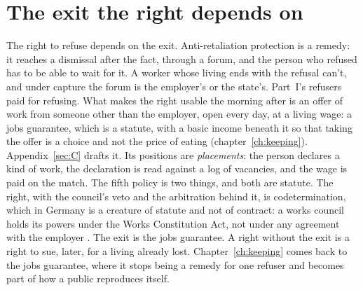 \section{The exit the right depends on}
\label{sec:10.2}
The right to refuse depends on the exit. Anti-retaliation protection is a remedy: it reaches a dismissal after the fact, through a forum, and the person who refused has to be able to wait for it. A worker whose living ends with the refusal can't, and under capture the forum is the employer's or the state's. Part~I's refusers paid for refusing. What makes the right usable the morning after is an offer of work from someone other than the employer, open every day, at a living wage: a jobs guarantee, which is a statute, with a basic income beneath it so that taking the offer is a choice and not the price of eating (chapter~\ref{ch:keeping}). Appendix~\ref{sec:C} drafts it. Its positions are \emph{placements}: the person declares a kind of work, the declaration is read against a log of vacancies, and the wage is paid on the match. The fifth policy is two things, and both are statute. The right, with the council's veto and the arbitration behind it, is codetermination, which in Germany is a creature of statute and not of contract: a works council holds its powers under the Works Constitution Act, not under any agreement with the employer \autocite{germany2001betrvg}. The exit is the jobs guarantee. A right without the exit is a right to sue, later, for a living already lost. Chapter~\ref{ch:keeping} comes back to the jobs guarantee, where it stops being a remedy for one refuser and becomes part of how a public reproduces itself.
